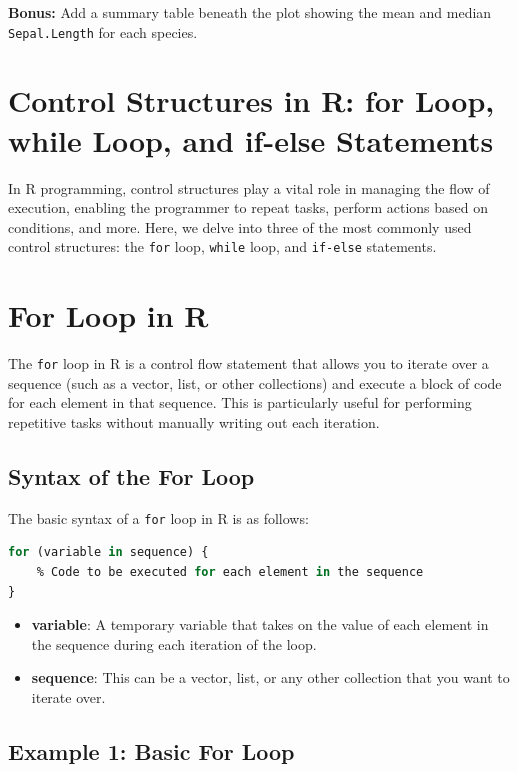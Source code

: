 \documentclass[10pt]{book}
\begin{document}
\textbf{Bonus:} Add a summary table beneath the plot showing the mean and median \texttt{Sepal.Length} for each species.






\section*{Control Structures in R: for Loop, while Loop, and if-else Statements}

In R programming, control structures play a vital role in managing the flow of execution, enabling the programmer to repeat tasks, perform actions based on conditions, and more. Here, we delve into three of the most commonly used control structures: the \texttt{for} loop, \texttt{while} loop, and \texttt{if-else} statements.

\section{For Loop in R}

The \texttt{for} loop in R is a control flow statement that allows you to iterate over a sequence (such as a vector, list, or other collections) and execute a block of code for each element in that sequence. This is particularly useful for performing repetitive tasks without manually writing out each iteration.

\subsection{Syntax of the For Loop}

The basic syntax of a \texttt{for} loop in R is as follows:

\begin{lstlisting}[language=R]
for (variable in sequence) {
    % Code to be executed for each element in the sequence
}
\end{lstlisting}

\begin{itemize}
    \item \textbf{variable}: A temporary variable that takes on the value of each element in the sequence during each iteration of the loop.
    \item \textbf{sequence}: This can be a vector, list, or any other collection that you want to iterate over.
\end{itemize}

\subsection{Example 1: Basic For Loop}
\end{document}
